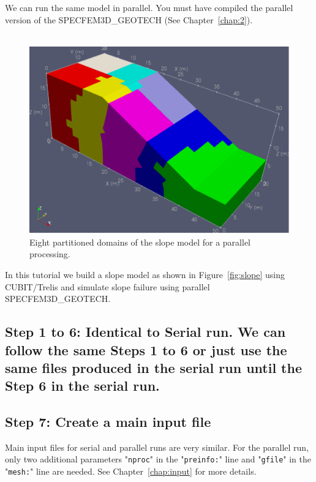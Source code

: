 We can run the same model in parallel. You must have compiled the parallel version of the SPECFEM3D\_GEOTECH (See Chapter~\ref{chap:2}).\\
\\
\begin{figure}[ht]
\centering
\includegraphics[scale=0.7]{cubit_example_parallel}
\caption{Eight partitioned domains of the slope model for a parallel processing.}
\label{fig:par}
\end{figure}

In this tutorial we build a slope model as shown in Figure~\ref{fig:slope} using CUBIT/Trelis and simulate slope failure using parallel SPECFEM3D\_GEOTECH.

\subsection*{Step 1 to 6: Identical to Serial run. We can follow the same Steps 1 to 6 or just use the same files produced in the serial run until the Step 6 in the serial run.}


\subsection*{Step 7: Create a main input file}

Main input files for serial and parallel runs are very similar. For the parallel run, only two additional parameters "\texttt{nproc}" in the "\texttt{preinfo:}" line and "\texttt{gfile}" in the "\texttt{mesh:}" line are needed. See Chapter~\ref{chap:input} for more details.\\
\\

